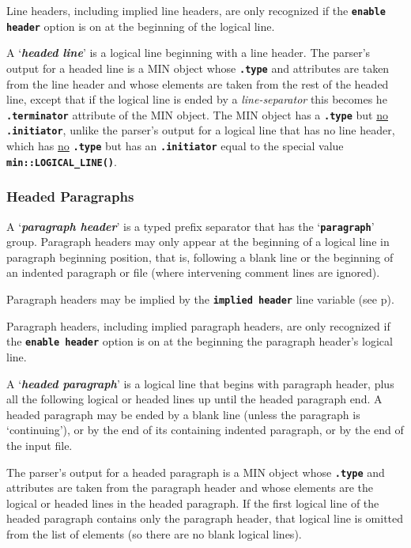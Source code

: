 \documentclass[12pt]{article}
\newcommand{\TT}[1]{{\tt \bfseries #1}}
\newcommand{\key}[1]{{\bf \em #1}\index{#1}}
\newcommand{\pagref}[1]{p\pageref{#1}}
\newcommand{\EOL}{\penalty \exhyphenpenalty}
\begin{document}
Line headers, including implied line headers,
are only recognized if the \TT{enable header}
option is on at the beginning of the logical line.

A `\key{headed line}' is a logical line beginning with a line header.
The parser's output
for a headed line is a MIN object whose \TT{.type} and attributes
are taken from the line header and whose elements are
taken from the rest of the headed line, except that if the
logical line is ended by a {\em line-separator} this becomes he
\TT{.terminator} attribute of the MIN object.  The MIN object has a \TT{.type}
but \underline{no}
\TT{.initiator}, unlike the parser's output
for a logical line that has no line header, which has \underline{no}
\TT{.type} but has an \TT{.initiator}
equal to the special value \TT{min::\EOL LOGICAL\_\EOL LINE()}.

\subsubsection{Headed Paragraphs}
\label{HEADED-PARAGRAPHS}

A `\key{paragraph header}' is a typed prefix separator that has
the `\TT{paragraph}' group.  Paragraph headers may only
appear at the beginning of a logical line in paragraph beginning position,
that is, following a blank
line or the beginning of an indented paragraph or file (where
intervening comment lines are ignored).

Paragraph headers may be implied 
by the \TT{implied header} line variable (see \pagref{IMPLIED-HEADER}).

Paragraph headers, including implied paragraph headers,
are only recognized if the \TT{enable header}
option is on at the beginning the paragraph header's logical line.

A `\key{headed paragraph}' is a logical line that begins with paragraph header,
plus all the following logical or headed
lines up until the headed paragraph end.
A headed paragraph may be ended by a blank line (unless the paragraph
is `continuing'), or by the end
of its containing indented paragraph, or by the end of the input file.

The parser's output for a headed paragraph is a MIN object 
whose \TT{.type} and attributes are taken from the paragraph header
and whose elements are the logical or headed lines in the headed paragraph.
If the first logical line of the headed paragraph contains only
the paragraph header, that logical line is omitted from the list of elements
(so there are no blank logical lines).
\end{document}
